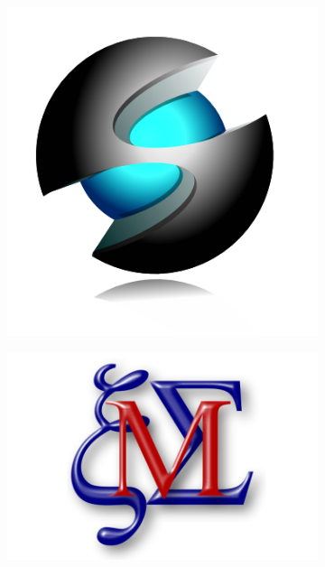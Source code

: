 \documentclass[12pt]{article}
\begin{document}
 \titlepage{}

\begin{figure} \centering
	\begin{subfigure}{0.15\textwidth} \flushleft{}
		\includegraphics[width=\linewidth]{foss_logo}
	\end{subfigure}%
		\begin{subfigure}{0.4\textwidth} \centering
		\includegraphics[width=\linewidth]{maxima}
	\end{subfigure}%

\end{figure}
\end{document}
